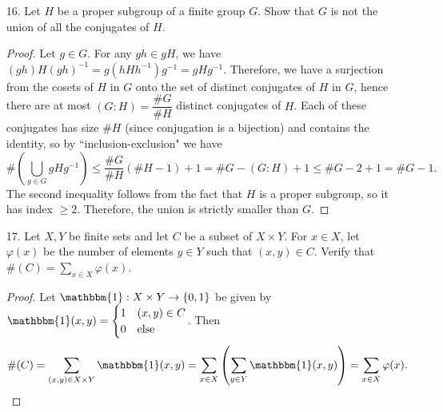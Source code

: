 \documentclass[10pt]{article}
\begin{document}
\begin{enumerate}
\begin{proof}
For any $s \in S$, we have $\dfrac{\# G}{\# G_s} = (G : G_s) = \# (Gs) = \# S$, so $\# G_s = \dfrac{\# G}{\# S}$.  Suppose, for a contradiction, that each element $x \in G$ has a fixed point.  Each stabilizer contains the identity, so by ``inclusion exclusion" we have
$$
\# G = \# S \dfrac{\# G}{\# S	} = \sum_{s \in S} \dfrac{\#G}{\#S} = \sum_{s \in S} \# G_s \geq \# S + (\#G - 1).
$$
The inequality is justified by the fact that, in summing the sizes of all the stabilizers, we count the identity element $\# S$ times and count every other element of $G$ at least once, since each element stabilizes some element.  This implies that $\# S \leq 1$, a contradiction.
\end{proof}

\item[16.] Let $H$ be a proper subgroup of a finite group $G$.  Show that $G$ is not the union of all the conjugates of $H$.

\begin{proof}
Let $g \in G$.  For any $gh \in gH$, we have $(gh)H(gh)^{-1} = g(hHh^{-1})g^{-1} = gHg^{-1}$.  Therefore, we have a surjection from the cosets of $H$ in $G$ onto the set of distinct conjugates of $H$ in $G$, hence there are at most $(G:H) = \dfrac{\# G}{\# H}$ distinct conjugates of $H$.  Each of these conjugates has size $\# H$ (since conjugation is a bijection) and contains the identity, so by ``inclusion-exclusion" we have
$$
\# \left( \bigcup_{g \in G} gHg^{-1} \right) \leq \dfrac{\# G}{\# H}(\# H - 1) + 1 = \# G - (G : H) + 1 \leq \# G - 2 + 1 = \# G - 1.
$$
The second inequality follows from the fact that $H$ is a proper subgroup, so it has index $\geq 2$.  Therefore, the union is strictly smaller than $G$.
\end{proof}

\item[17.] Let $X,Y$ be finite sets and let $C$ be a subset of $X \times Y$.  For $x \in X$, let $\varphi(x)$ be the number of elements $y \in Y$ such that $(x,y) \in C$.  Verify that $\#(C) = \sum\limits_{x \in X} \varphi(x)$.

\begin{proof}

Let $\mathbbm{1}:X \times Y \rightarrow \{0,1\}$ be given by $\mathbbm{1}(x,y) = \begin{cases} 1 & (x,y) \in C \\ 0 & \text{else} \end{cases}$.  Then
$$
\#(C) = \sum_{(x,y) \in X \times Y} \mathbbm{1}(x,y) = \sum_{x \in X} \left(\sum_{y \in Y} \mathbbm{1}(x,y) \right) = \sum_{x \in X} \varphi(x).
$$


\end{proof}
\end{enumerate}
\end{document}
